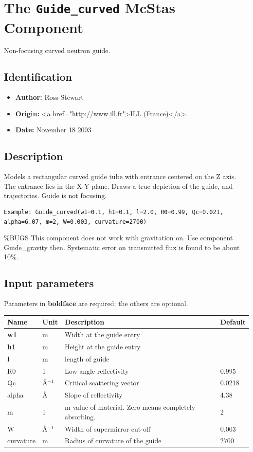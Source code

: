 \section{The \texttt{Guide\_curved} McStas Component}
Non-focusing curved neutron guide.

\subsection*{Identification}
\begin{itemize}
  \item \textbf{Author:} Ross Stewart
  \item \textbf{Origin:} \textless{}a href="http://www.ill.fr"\textgreater{}ILL (France)\textless{}/a\textgreater{}.
  \item \textbf{Date:} November 18 2003
\end{itemize}

\subsection*{Description}
Models a rectangular curved guide tube with entrance centered on the Z axis. The entrance lies in the X-Y plane. Draws a true depiction of the guide, and trajectories. Guide is not focusing.

\begin{verbatim}
Example: Guide_curved(w1=0.1, h1=0.1, l=2.0, R0=0.99, Qc=0.021,
alpha=6.07, m=2, W=0.003, curvature=2700)
\end{verbatim}

\%BUGS This component does not work with gravitation on. Use component Guide\_gravity then. Systematic error on transmitted flux is found to be about 10\%.

\subsection*{Input parameters}
Parameters in \textbf{boldface} are required; the others are optional.

\begin{longtable}{p{}p{}p{}p{}}
\toprule
\textbf{Name} & \textbf{Unit} & \textbf{Description} & \textbf{Default} \\
\midrule
\endhead
\textbf{w1} & m & Width at the guide entry &  \\
\textbf{h1} & m & Height at the guide entry &  \\
\textbf{l} & m & length of guide &  \\
R0 & 1 & Low-angle reflectivity & 0.995 \\
Qc & \AA{}$^{-1}$ & Critical scattering vector & 0.0218 \\
alpha & \AA{} & Slope of reflectivity & 4.38 \\
m & 1 & m-value of material. Zero means completely absorbing. & 2 \\
W & \AA{}$^{-1}$ & Width of supermirror cut-off & 0.003 \\
curvature & m & Radius of curvature of the guide & 2700 \\
\bottomrule
\end{longtable}

